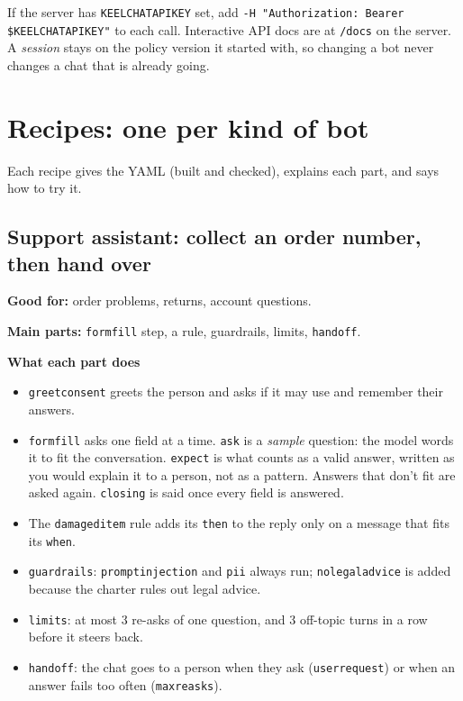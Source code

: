 \documentclass[11pt,a4paper]{article}
\newcommand{\snip}[1]{}
\newcommand{\codeus}{\textunderscore\allowbreak}
\newcommand{\code}[1]{{\renewcommand{\_}{\codeus}\texttt{\upshape #1}}}
\newcommand{\key}[1]{{\renewcommand{\_}{\codeus}\texttt{\color{ckey}#1}}}
\newcommand{\recipehead}[2]{%
  \begin{tcolorbox}[enhanced,colback=boxE,colframe=boxE,arc=2pt,left=8pt,right=8pt,top=4pt,bottom=4pt]
  \small\textbf{\color{keel}Good for:} #1\par
  \textbf{\color{keel}Main parts:} #2
  \end{tcolorbox}}
\begin{document}
\begin{note}
If the server has \code{KEELCHAT\_API\_KEY} set, add \code{-H "Authorization: Bearer \$KEELCHAT\_API\_KEY"} to
each call. Interactive API docs are at \code{/docs} on the server. A \emph{session} stays on the policy version
it started with, so changing a bot never changes a chat that is already going.
\end{note}

\section{Recipes: one per kind of bot}

Each recipe gives the YAML (built and checked), explains each part, and says how to try it.

\subsection{Support assistant: collect an order number, then hand over}
\recipehead{order problems, returns, account questions.}{\key{form\_fill} step, a rule, guardrails, limits, \key{handoff}.}

\snip{02_support.yaml}

\textbf{What each part does}
\begin{itemize}[leftmargin=1.2em]
  \item \key{greet\_consent} greets the person and asks if it may use and remember their answers.
  \item \key{form\_fill} asks one field at a time. \key{ask} is a \emph{sample} question: the model words it to fit
    the conversation. \key{expect} is what counts as a valid answer, written as you would explain it to a person,
    not as a pattern. Answers that don't fit are asked again. \key{closing} is said once every field is answered.
  \item The \key{damaged\_item} rule adds its \key{then} to the reply only on a message that fits its \key{when}.
  \item \key{guardrails}: \code{prompt\_injection} and \code{pii} always run; \code{no\_legal\_advice} is added because the
    charter rules out legal advice.
  \item \key{limits}: at most 3 re-asks of one question, and 3 off-topic turns in a row before it steers back.
  \item \key{handoff}: the chat goes to a person when they ask (\code{user\_request}) or when an answer fails too
    often (\code{max\_reasks}).
\end{itemize}
\end{document}
